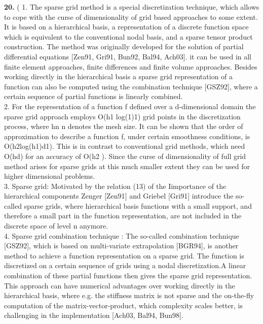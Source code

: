 \textbf{20.}
(
1. The sparse grid method is a special discretization technique, which allows to cope with the curse of dimensionality of grid based approaches to some extent. It is based on a hierarchical basis, a representation of a discrete function space which is equivalent to the conventional nodal basis, and a sparse tensor product construction. 
The method was originally developed for the solution of partial differential equations [Zen91, Gri91, Bun92, Bal94, Ach03]. it can be used in all finite element approaches, finite differences and finite volume approaches.
Besides working directly in the hierarchical basis a sparse grid representation of a function can also be computed using the combination technique [GSZ92], where a certain sequence of partial functions is linearly combined.\cite{Garcke2006a}\\

2. For the representation of a function f defined over a d-dimensional domain the sparse grid approach employs O(h1 log(1)1) grid points in the discretization process, where hn n denotes the mesh size. It can be shown
that the order of approximation to describe a function f, under certain smoothness conditions, is O(h2log(h1)d1). This is in contrast to conventional grid methods, which need O(hd) for an accuracy of O(h2 ). Since the curse of dimensionality of full grid method arises for sparse grids at this much smaller extent they can be used for higher dimensional problems.\cite{Garcke2006a}\\

 3. Sparse grid: 
Motivated by the relation (13) of the Iimportance of the hierarchical components Zenger [Zen91] and Griebel [Gri91] introduce the so-called sparse grids, where hierarchical basis functions with a small support, and therefore a small part in the function representation, are not included in the discrete space of level n anymore.\cite{Garcke2006a}\\

4. Sparse grid combination technique : The so-called combination technique [GSZ92], which is based on multi-variate extrapolation [BGR94], is another method to achieve a function representation on a sparse grid. The function is discretized on a certain sequence of grids using a nodal discretization.A linear combination of these partial functions then gives the sparse grid representation. This approach can have numerical advantages over working directly in the hierarchical basis, where e.g. the stiffness matrix is not sparse and the on-the-fly computation of the matrix-vector-product, which complexity scales better, is challenging in the implementation [Ach03, Bal94, Bun98].\cite{Garcke2006a}\\

